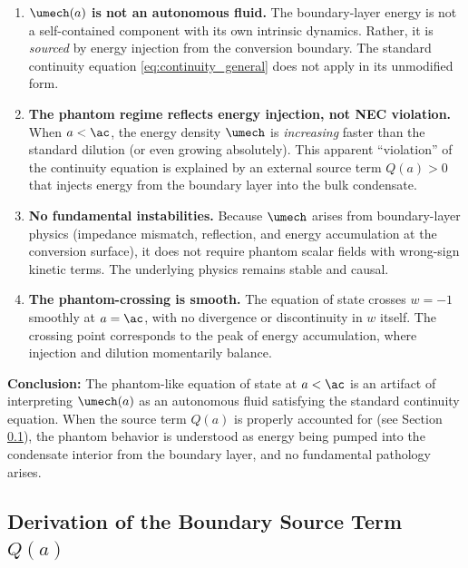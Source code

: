 \begin{enumerate}
    \item \textbf{$\umech(a)$ is not an autonomous fluid.} The boundary-layer energy is not a self-contained component with its own intrinsic dynamics. Rather, it is \emph{sourced} by energy injection from the conversion boundary. The standard continuity equation \eqref{eq:continuity_general} does not apply in its unmodified form.

    \item \textbf{The phantom regime reflects energy injection, not NEC violation.} When $a < \ac$, the energy density $\umech$ is \emph{increasing} faster than the standard dilution (or even growing absolutely). This apparent ``violation'' of the continuity equation is explained by an external source term $Q(a) > 0$ that injects energy from the boundary layer into the bulk condensate.

    \item \textbf{No fundamental instabilities.} Because $\umech$ arises from boundary-layer physics (impedance mismatch, reflection, and energy accumulation at the conversion surface), it does not require phantom scalar fields with wrong-sign kinetic terms. The underlying physics remains stable and causal.

    \item \textbf{The phantom-crossing is smooth.} The equation of state crosses $w = -1$ smoothly at $a = \ac$, with no divergence or discontinuity in $w$ itself. The crossing point corresponds to the peak of energy accumulation, where injection and dilution momentarily balance.
\end{enumerate}

\textbf{Conclusion:} The phantom-like equation of state at $a < \ac$ is an artifact of interpreting $\umech(a)$ as an autonomous fluid satisfying the standard continuity equation. When the source term $Q(a)$ is properly accounted for (see Section \ref{sec:source_term}), the phantom behavior is understood as energy being pumped into the condensate interior from the boundary layer, and no fundamental pathology arises.



\subsection{Derivation of the Boundary Source Term $Q(a)$}
\label{sec:source_term}

